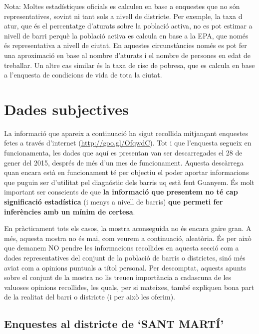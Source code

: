 \documentclass[]{article}
\begin{document}
Nota: Moltes estadístiques oficials es calculen en base a enquestes que
no són representatives, sovint ni tant sols a nivell de districte. Per
exemple, la taxa d atur, que és el percentatge d'aturats sobre la
població activa, no es pot estimar a nivell de barri perquè la població
activa es calcula en base a la EPA, que només és representativa a nivell
de ciutat. En aquestes circunstàncies només es pot fer una aproximació
en base al nombre d'aturats i el nombre de persones en edat de
treballar. Un altre cas similar és la taxa de risc de pobresa, que es
calcula en base a l'enquesta de condicions de vida de tota la ciutat.

\newpage

\section{\textbf{Dades subjectives}}\label{dades-subjectives}

La informació que apareix a continuació ha sigut recollida mitjançant
enquestes fetes a través d'internet
(\href{http://goo.gl/OfqwdC}{\url{http://goo.gl/OfqwdC}}). Tot i que
l'enquesta segueix en funcionamenta, les dades que aquí es presentan van
ser descarregades el 28 de gener del 2015, després de més d'un mes de
funcionament. Aquesta descàrrega quan encara està en funcionament té per
objectiu el poder aportar informacions que puguin ser d'utilitat pel
diagnóstic dels barris uq està fent Guanyem. És molt important ser
conscients de que \textbf{la informació que presentem no té cap
significació estadística} (i menys a nivell de barris) \textbf{que
permeti fer inferències amb un mínim de certesa}.

En pràcticament tots els casos, la mostra aconseguida no és encara gaire
gran. A més, aquesta mostra no és mai, com veurem a continuació,
aleatòria. És per això que demanem NO pendre les informacions recollides
en aquesta secció com a dades representatives del conjunt de la població
de barris o districtes, sinó més aviat com a opinions puntuals a títol
personal. Per descomptat, aquests apunts sobre el conjunt de la mostra
no lis treuen importància a cadascuna de les valuoses opinions
recollides, les quals, per si mateixes, també expliquen bona part de la
realitat del barri o districte (i per això les oferim).

\subsection{Enquestes al districte de `SANT
MARTÍ'}\label{enquestes-al-districte-de-sant-marti}
\end{document}
